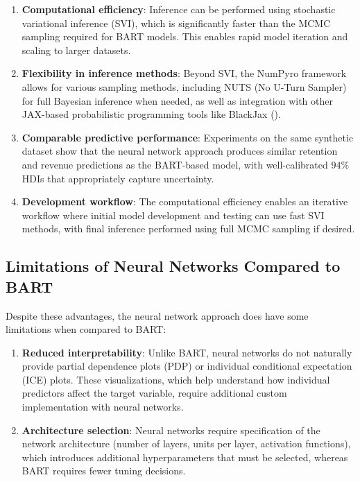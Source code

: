 \documentclass[11pt]{amsart}
\theoremstyle{definition}
\begin{document}
\begin{enumerate}
    \item \textbf{Computational efficiency}: Inference can be performed using stochastic variational inference (SVI), which
          is significantly faster than the MCMC sampling required for BART models. This enables rapid model iteration and
          scaling to larger datasets.

    \item \textbf{Flexibility in inference methods}: Beyond SVI, the NumPyro framework allows for various sampling methods,
          including NUTS (No U-Turn Sampler) for full Bayesian inference when needed, as well as integration with other
          JAX-based probabilistic programming tools like BlackJax (\cite{cabezas2024blackjax}).

    \item \textbf{Comparable predictive performance}: Experiments on the same synthetic dataset show that the neural network
          approach produces similar retention and revenue predictions as the BART-based model, with well-calibrated $94\%$ HDIs
          that appropriately capture uncertainty.

    \item \textbf{Development workflow}: The computational efficiency enables an iterative workflow where initial model
          development and testing can use fast SVI methods, with final inference performed using full MCMC sampling if desired.
\end{enumerate}

\subsection{Limitations of Neural Networks Compared to BART}

Despite these advantages, the neural network approach does have some limitations when compared to BART:

\begin{enumerate}
    \item \textbf{Reduced interpretability}: Unlike BART, neural networks do not naturally provide partial dependence plots
          (PDP) or individual conditional expectation (ICE) plots. These visualizations, which help understand how individual
          predictors affect the target variable, require additional custom implementation with neural networks.

    \item \textbf{Architecture selection}: Neural networks require specification of the network architecture (number of
          layers, units per layer, activation functions), which introduces additional hyperparameters that must be selected,
          whereas BART requires fewer tuning decisions.
\end{enumerate}
\end{document}
